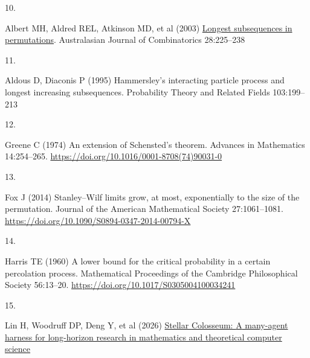 \documentclass[
  11pt,
]{article}
\newlength{\cslhangindent}
\newlength{\csllabelwidth}
\newenvironment{CSLReferences}[2] %
 {\begin{list}{}{%
  \setlength{\itemindent}{0pt}
  \setlength{\leftmargin}{0pt}
  \setlength{\parsep}{0pt}
  \ifodd #1
   \setlength{\leftmargin}{\cslhangindent}
   \setlength{\itemindent}{-1\cslhangindent}
  \fi
  \setlength{\itemsep}{#2\baselineskip}}}
 {\end{list}}
\newcommand{\CSLLeftMargin}[1]{\parbox[t]{\csllabelwidth}{\strut#1\strut}}
\newcommand{\CSLRightInline}[1]{\parbox[t]{\linewidth - \csllabelwidth}{\strut#1\strut}}
\begin{document}
\begin{CSLReferences}{0}{1}
\CSLLeftMargin{10. }%
\CSLRightInline{Albert MH, Aldred REL, Atkinson MD, et al (2003)
\href{https://ajc.maths.uq.edu.au/pdf/28/ajc_v28_p225.pdf}{Longest
subsequences in permutations}. Australasian Journal of Combinatorics
28:225--238}

\CSLLeftMargin{11. }%
\CSLRightInline{Aldous D, Diaconis P (1995) Hammersley's interacting
particle process and longest increasing subsequences. Probability Theory
and Related Fields 103:199--213}

\CSLLeftMargin{12. }%
\CSLRightInline{Greene C (1974) An extension of {S}chensted's theorem.
Advances in Mathematics 14:254--265.
\url{https://doi.org/10.1016/0001-8708(74)90031-0}}

\CSLLeftMargin{13. }%
\CSLRightInline{Fox J (2014) Stanley--{W}ilf limits grow, at most,
exponentially to the size of the permutation. Journal of the American
Mathematical Society 27:1061--1081.
\url{https://doi.org/10.1090/S0894-0347-2014-00794-X}}

\CSLLeftMargin{14. }%
\CSLRightInline{Harris TE (1960) A lower bound for the critical
probability in a certain percolation process. Mathematical Proceedings
of the Cambridge Philosophical Society 56:13--20.
\url{https://doi.org/10.1017/S0305004100034241}}

\CSLLeftMargin{15. }%
\CSLRightInline{Lin H, Woodruff DP, Deng Y, et al (2026)
\href{https://arxiv.org/abs/2609.15983}{Stellar {C}olosseum: {A}
many-agent harness for long-horizon research in mathematics and
theoretical computer science}}

\end{CSLReferences}
\end{document}
